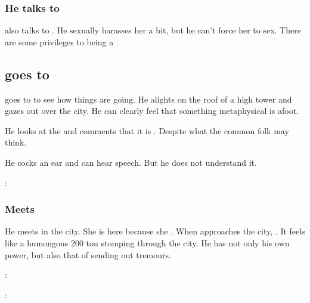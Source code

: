 \begin{garbage}
\subsubsection{He talks to \Achsah}
\Teshrial{} also talks to \Achsah{}. He sexually harasses her a bit, but he can't force her to sex. There are some privileges to being a \resvil.









\subsection{\Ishnaruchaefir{} goes to \Forklin}
\Ishnaruchaefir{} goes to \Forklin{} to see how things are going. 
He alights on the roof of a high tower and gazes out over the city. 
He can clearly feel that something metaphysical is afoot. 

He looks at the  and comments that it is . 
Despite what the common folk may think. 

He cocks an ear and can hear speech. 
But he does not understand it. 

\begin{prose}
  \Ishnaruchaefir: 
\end{prose}






\subsubsection{Meets \Achsah}
He meets \Achsah{} in the city. 
She is here because she . 
When \Ishnaruchaefir{} approaches the city, \Achsah{} . 
It feels like a humongous 200 ton \hs{\brukath} stomping through the city. 
He has not only his own \vertex{} power, but also that of \Rystessakhin{} sending out tremours. 

\begin{prose}
  \Ishnaruchaefir: 
  
  \Achsah:
\end{prose}


\end{garbage}
